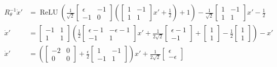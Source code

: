\documentclass{article} %
\theoremstyle{definition}
\theoremstyle{remark}
\begin{document}
\begin{align}
R_{\theta}^{-1}\dot x' &= \operatorname{ReLU}\left(\frac{1}{\sqrt{2}}\begin{bmatrix}\epsilon &-1\\-1&0\end{bmatrix}\left(\begin{bmatrix}1 &-1\\1&1\end{bmatrix} x'+\frac{1}{2}\right)+1\right)-\frac{1}{\sqrt{2}}\begin{bmatrix}1 &-1\\1&1\end{bmatrix} x'-\frac{1}{2}\\
\dot x' &=\begin{bmatrix}-1 &1\\1&1\end{bmatrix}\left(\frac{1}{2}\begin{bmatrix}\epsilon-1 &-\epsilon-1\\-1&1\end{bmatrix}x' + \frac{1}{2\sqrt{2}}\begin{bmatrix}\epsilon-1 \\-1\end{bmatrix}+\begin{bmatrix}1 \\1\end{bmatrix}-\frac{1}{2}\begin{bmatrix}1 \\1\end{bmatrix}\right)-x'\\
\dot x' &=\left(\begin{bmatrix}-2 &0\\0&0\end{bmatrix}+\frac{\epsilon}{2}\begin{bmatrix}1 &-1\\-1&1\end{bmatrix}\right)x' + \frac{1}{2\sqrt{2}}\begin{bmatrix}\epsilon \\-\epsilon\end{bmatrix}
\end{align}
\end{document}
